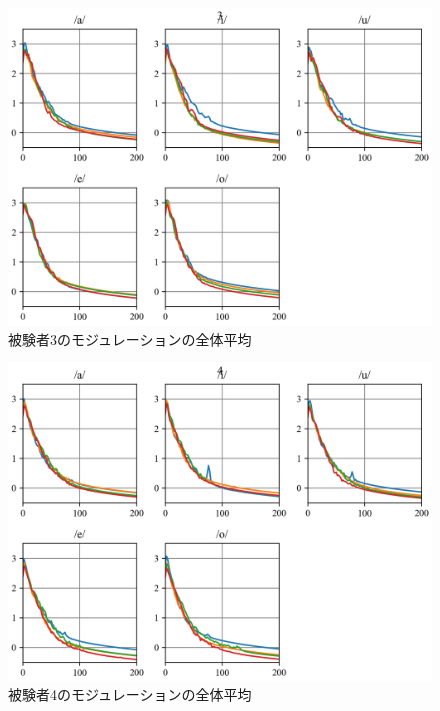 \documentclass[10ptj,a4j,dvipdfmx,uplatex, oneside, openany]{jsbook}%
\begin{document}
\begin{figure}[htbp]
    \begin{center}
      \includegraphics[clip,width=12.0cm]{long_spectrogram_3.png}
      \caption{被験者3のモジュレーションの全体平均}
      \label{long_spectrogram_3}
    \end{center}
\end{figure}

\begin{figure}[htbp]
    \begin{center}
      \includegraphics[clip,width=12.0cm]{long_spectrogram_4.png}
      \caption{被験者4のモジュレーションの全体平均}
      \label{long_spectrogram_4}
    \end{center}
\end{figure}



\end{document}
